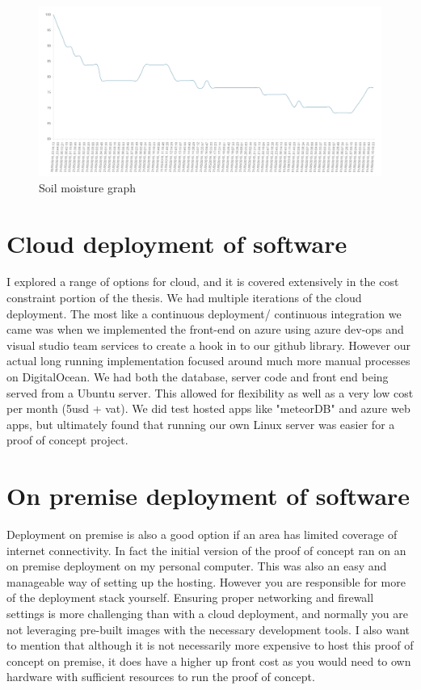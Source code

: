 \documentclass[]{uiophd}
\begin{document}
 \begin{figure}[h]
\caption{Soil moisture graph}
\centering
\includegraphics[width=12cm]{watergraph.png}
\end{figure}

\section{Cloud deployment of software}
I explored a range of options for cloud, and it is covered extensively in the cost constraint portion of the thesis. We had multiple iterations of the cloud deployment. The most like a continuous deployment/ continuous integration we came was when we implemented the front-end on azure using azure dev-ops and visual studio team services to create a hook in to our github library. However our actual long running implementation focused around much more manual processes on DigitalOcean. We had both the database, server code and front end being served from a Ubuntu server. This allowed for flexibility as well as a very low cost per month (5usd + vat). We did test hosted apps like "meteorDB" and azure web apps, but ultimately found that running our own Linux server was easier for a proof of concept project.

\section{On premise deployment of software}
Deployment on premise is also a good option if an area has limited coverage of internet connectivity. In fact the initial version of the proof of concept ran on an on premise deployment on my personal computer. This was also an easy and manageable way of setting up the hosting. However you are responsible for more of the deployment stack yourself. Ensuring proper networking and firewall settings is more challenging than with a cloud deployment, and normally you are not leveraging pre-built images with the necessary development tools. I also want to mention that although it is not necessarily more expensive to host this proof of concept on premise, it does have a higher up front cost as you would need to own hardware with sufficient resources to run the proof of concept.
\end{document}
